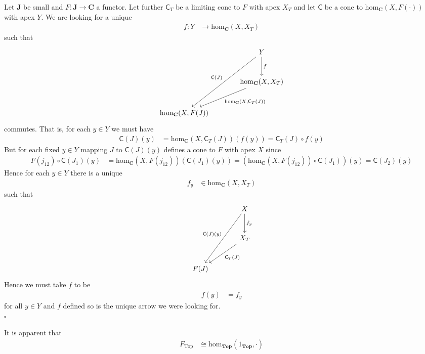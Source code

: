 \begin{prf}
Let $\mathbf{J}$ be small and $F \colon \mathbf{J} \rightarrow \mathbf{C}$ a functor. Let further $\mathsf{C}_{T}$ be a limiting cone to $F$ with apex $X_{T}$ and let $\mathsf{C}$ be a cone to $\mathrm{hom}_{\mathbf{C}}(X,F(\cdot))$ with apex $Y$. We are looking for a unique
\begin{align*}
  f
  \colon
  Y
  &\rightarrow
  \mathrm{hom}_{\mathbf{C}}(X,X_{T})
\end{align*}
such that
\[
\begin{tikzcd}[sep=large]
  &
  Y
  \arrow{d}{f}
  \arrow[swap]{ddl}{\mathsf{C}(J)}
  \\
  &
  \mathrm{hom}_{\mathbf{C}}(X,X_{T})
  \arrow{dl}{\mathrm{hom}_{\mathbf{C}}(X,\mathsf{C}_{T}(J))}
  \\
  \mathrm{hom}_{\mathbf{C}}(X,F(J))
\end{tikzcd}
\]
commutes. That is, for each $y \in Y$ we must have
\begin{align*}
  \mathsf{C}(J)(y)
  &=
  \mathrm{hom}_{\mathbf{C}}(X,\mathsf{C}_{T}(J))(f(y))
  =
  \mathsf{C}_{T}(J)
  \circ
  f(y)
\end{align*}
But for each fixed $y \in Y$ mapping $J$ to $\mathsf{C}(J)(y)$ defines a cone to $F$ with apex $X$ since
\begin{align*}
  F(j_{12})
  \circ
  \mathsf{C}(J_{1})(y)
  &=
  \mathrm{hom}_{\mathbf{C}}(X,F(j_{12}))(\mathsf{C}(J_{1})(y))
  =
  \left(
    \mathrm{hom}_{\mathbf{C}}(X,F(j_{12}))
    \circ
    \mathsf{C}(J_{1})
  \right)
  (y)
  =
  \mathsf{C}(J_{2})(y)
\end{align*}
Hence for each $y \in Y$ there is a unique
\begin{align*}
  f_{y}
  &\in
  \mathrm{hom}_{\mathbf{C}}(X,X_{T})
\end{align*}
such that
\[
\begin{tikzcd}[sep=large]
  &
  X
  \arrow{d}{f_{y}}
  \arrow[swap]{ddl}{\mathsf{C}(J)(y)}
  \\
  &
  X_{T}
  \arrow{dl}{\mathsf{C}_{T}(J)}
  \\
  F(J)
\end{tikzcd}
\]
Hence we must take $f$ to be
\begin{align*}
  f(y)
  &=
  f_{y}
\end{align*}
for all $y \in Y$ and $f$ defined so is the unique arrow we were looking for.
\\
\phantom{proven}
\hfill
$\square$
\end{prf}
It is apparent that
\begin{align*}
  F_{\mathrm{Top}}
  &\cong
  \mathrm{hom}_{\mathbf{Top}}(1_{\mathbf{Top}},\cdot)
\end{align*}
